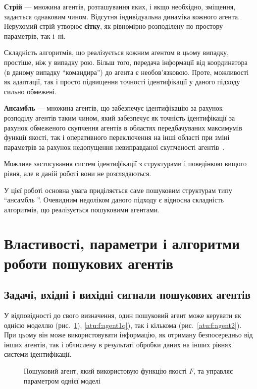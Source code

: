 \textbf{Стрій} --- множина агентів, розташування яких, і якщо необхідно,
зміщення, задається однаковим чином. Відсутня індивідуальна динаміка кожного
агента. Нерухомий стрій утворює \textbf{сітку},
як рівномірно розподілену по простору параметрів, так і~ні.

Складність алгоритмів, що реалізується кожним агентом в цьому
випадку, простіше, ніж у випадку рою. Більш того, передача
інформації від координатора (в даному випадку ``командира'')
до агента є необов'язковою. Проте, можливості як адаптації, так
і просто підвищення точності ідентифікації у даного підходу
сильно обмежені.

\textbf {Ансамбль} ---
множина агентів, що забезпечує ідентифікацію за рахунок розподілу агентів таким
чином, який забезпечує як точність ідентифікації за рахунок обмеженого
скупчення агентів в областях передбачуваних максимумів функції якості, так і оперативного
переключення на інші області при зміні параметрів за рахунок недопущення
невиправданої скупченості агентів~\cite{atu_ric2016}.

Можливе застосування систем ідентифікації з структурами
і поведінкою вищого рівня, але в даній роботі вони не
розглядаються.

У цієї роботі основна увага приділяється саме пошуковим структурам типу
``ансамбль ''. Очевидним недоліком даного підходу є відносна складність
алгоритмів, що реалізується пошуковими агентами.



\section{Властивості, параметри і алгоритми роботи пошукових агентів} %

\subsection{Задачі, вхідні і вихідні сигнали пошукових агентів} %

У відповідності до свого визначення, один пошуковий агент може керувати як
однією моделлю (рис.~\ref{atu:f:agent1}), \ref{atu:f:agent1q}),
так і кількома (рис.~\ref{atu:f:agent2}). При цьому він
може використовувати інформацію, як отриману безпосередньо від інших агентів,
так і обчислену в результаті обробки даних на інших рівнях системи
ідентифікації.

\begin{figure}[htb!]
\begin{center}

\end{center}
\caption{Пошуковий агент, який використовую функцію якості $F$, та управляє параметром однієї моделі}
\label{atu:f:agent1}
\end{figure}


